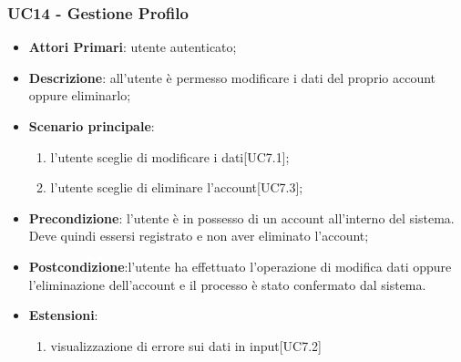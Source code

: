 \subsubsection{UC14 - Gestione Profilo}
\begin{itemize}
	\item \textbf{Attori Primari}: utente autenticato;
	\item \textbf{Descrizione}: all'utente è permesso modificare i dati del proprio account oppure eliminarlo;
	\item \textbf{Scenario principale}: 
	\begin{enumerate}[label=\alph*.]
		\item l'utente sceglie di modificare i dati[UC7.1];
		\item l'utente sceglie di eliminare l'account[UC7.3];
	\end{enumerate}
	
	\item \textbf{Precondizione}: l'utente è in possesso di un account all'interno del sistema. Deve quindi essersi registrato e non aver eliminato l'account;
	\item \textbf{Postcondizione}:l'utente ha effettuato l'operazione di modifica dati oppure l'eliminazione dell'account e il processo è stato confermato dal sistema.
	\item \textbf{Estensioni}:
	\begin{enumerate}
	\item visualizzazione di errore sui dati in input[UC7.2]
	\end{enumerate}
\end{itemize} 

